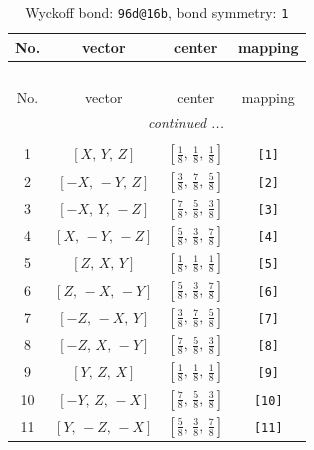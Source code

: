 \documentclass[fleqn,8pt]{jsarticle}
\begin{document}
\begin{longtable}{cccc}
\caption{Wyckoff bond: {\tt 96d@16b}, bond symmetry: {\tt 1}}
 \\
 \hline \hline
No. & vector & center & mapping \\ \hline \endfirsthead

\multicolumn{3}{l}{\tablename\ \thetable{}} \\
 \hline \hline
No. & vector & center & mapping \\ \hline \endhead

 \hline \hline
\multicolumn{3}{r}{\footnotesize\it continued ...} \\ \endfoot

 \hline \hline
\multicolumn{3}{r}{} \\ \endlastfoot

1 & $\left[ X,\, Y,\, Z \right]$ & $\left[ \frac{1}{8},\, \frac{1}{8},\, \frac{1}{8} \right]$ & {\tt [1]} \\ \hline
2 & $\left[ - X,\, - Y,\, Z \right]$ & $\left[ \frac{3}{8},\, \frac{7}{8},\, \frac{5}{8} \right]$ & {\tt [2]} \\ \hline
3 & $\left[ - X,\, Y,\, - Z \right]$ & $\left[ \frac{7}{8},\, \frac{5}{8},\, \frac{3}{8} \right]$ & {\tt [3]} \\ \hline
4 & $\left[ X,\, - Y,\, - Z \right]$ & $\left[ \frac{5}{8},\, \frac{3}{8},\, \frac{7}{8} \right]$ & {\tt [4]} \\ \hline
5 & $\left[ Z,\, X,\, Y \right]$ & $\left[ \frac{1}{8},\, \frac{1}{8},\, \frac{1}{8} \right]$ & {\tt [5]} \\ \hline
6 & $\left[ Z,\, - X,\, - Y \right]$ & $\left[ \frac{5}{8},\, \frac{3}{8},\, \frac{7}{8} \right]$ & {\tt [6]} \\ \hline
7 & $\left[ - Z,\, - X,\, Y \right]$ & $\left[ \frac{3}{8},\, \frac{7}{8},\, \frac{5}{8} \right]$ & {\tt [7]} \\ \hline
8 & $\left[ - Z,\, X,\, - Y \right]$ & $\left[ \frac{7}{8},\, \frac{5}{8},\, \frac{3}{8} \right]$ & {\tt [8]} \\ \hline
9 & $\left[ Y,\, Z,\, X \right]$ & $\left[ \frac{1}{8},\, \frac{1}{8},\, \frac{1}{8} \right]$ & {\tt [9]} \\ \hline
10 & $\left[ - Y,\, Z,\, - X \right]$ & $\left[ \frac{7}{8},\, \frac{5}{8},\, \frac{3}{8} \right]$ & {\tt [10]} \\ \hline
11 & $\left[ Y,\, - Z,\, - X \right]$ & $\left[ \frac{5}{8},\, \frac{3}{8},\, \frac{7}{8} \right]$ & {\tt [11]} \\ \hline

\end{longtable}
\end{document}
